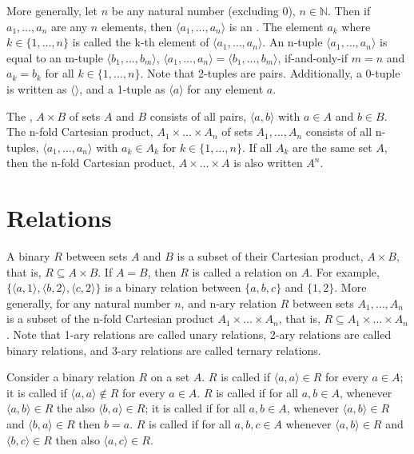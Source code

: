 \pn More generally, let $n$ be any natural number (excluding 0), $n\in\mathbb{N}$.  Then if $a_1,\ldots,a_n$ are any $n$ elements, then $\langle a_1,\ldots,a_n\rangle$ is an .   The element $a_k$ where $k\in\{1,\ldots,n\}$ is called the k-th element of $\langle a_1,\ldots,a_n\rangle$.
An n-tuple $\langle a_1,\ldots,a_n\rangle$ is equal to an m-tuple 
$\langle b_1,\ldots,b_m\rangle$, $\langle a_1,\ldots,a_n\rangle=\langle b_1,\ldots,b_m\rangle$, if-and-only-if $m=n$ and $a_k=b_k$ for all $k\in\{1,\ldots,n\}$.  Note that 2-tuples are pairs.  Additionally, a 0-tuple is written as $\langle \rangle$, and a 1-tuple as $\langle a\rangle$ for any element $a$.

\pn The , $A\times B$ of sets $A$ and $B$ consists of all pairs, $\langle a,b\rangle$ with $a\in A$ and $b\in B$.  The n-fold Cartesian product, $A_1\times\ldots\times A_n$ of sets $A_1,\ldots,A_n$ consists of all n-tuples, 
$\langle a_1,\ldots,a_n\rangle$ with $a_k\in A_k$ for $k\in\{1,\ldots,n\}$.  If all $A_k$ are the same set $A$, then the n-fold Cartesian product, $A\times\ldots\times A$ is also written $A^n$.

\section{Relations}\label{sec:informal_relationsmath}

\pn A binary  $R$ between sets $A$ and $B$ is a subset of their Cartesian product, $A\times B$, that is, 
$R\subseteq A\times B$.  If $A=B$, then $R$ is called a relation on $A$.  For example,
\(\{\langle a,1\rangle,\langle b,2\rangle,\langle c,2\rangle\}\)
is a binary relation between $\{a,b,c\}$ and $\{1,2\}$.  More generally, for any natural number $n$, and n-ary relation $R$ between sets $A_1,\ldots,A_n$ is a subset of the n-fold Cartesian product $A_1\times\ldots\times A_n$, that is, 
$R\subseteq A_1\times\ldots\times A_n$.  Note that 1-ary relations are called unary relations, 2-ary relations are called binary relations, and 3-ary relations are called ternary relations.

\pn Consider a binary relation $R$ on a set $A$.  $R$ is called  if $\langle a,a\rangle\in R$ for every $a\in A$; it is called  if $\langle a,a\rangle\notin R$ for every $a\in A$.  $R$ is called  if for all $a,b\in A$, whenever $\langle a,b\rangle\in R$ the also $\langle b,a\rangle\in R$; it is called  if for all $a,b\in A$, whenever 
$\langle a,b\rangle\in R$ and $\langle b,a\rangle\in R$ then $b=a$.  $R$ is called  if for all $a,b,c\in A$ whenever $\langle a,b\rangle\in R$ and $\langle b,c\rangle\in R$ then also $\langle a,c\rangle\in R$.

